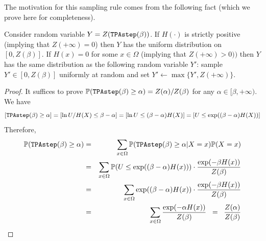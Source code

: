 \documentclass[final,12pt]{colt2018}
\def\P{{\mathbb P}}
\begin{document}


The motivation for this sampling rule comes from the following  fact (which we  prove here for completeness).
\begin{lemma}\label{lemma:TPAstep} Consider random variable $Y=Z({\tt TPAstep}(\beta))$.
If  $H(\cdot)$ is strictly positive (implying that $Z(+\infty)=0$)
then $Y$ has the uniform distribution on $[0,Z(\beta)]$.
If $H(x)=0$ for some $x\in\Omega$ (implying that $Z(+\infty)>0))$
then $Y$ has the same distribution as the following random variable $Y'$:
sample $Y'\in[0,Z(\beta)]$ uniformly at random and set $Y'\leftarrow\max\{Y',Z(+\infty)\}$.
\end{lemma}
\begin{proof}
It suffices to prove 
$\P({\tt TPAstep}(\beta)\ge \alpha)=Z(\alpha)/Z(\beta)$
for any $\alpha\in[\beta,+\infty)$.
We have
 $$[{\tt TPAstep}(\beta)\ge \alpha]=[\ln U/H(X)\le \beta-\alpha]=[\ln U\le (\beta-\alpha)H(X)]=[U\le \exp((\beta-\alpha)H(X))]$$
Therefore,
\begin{eqnarray*}
\P({\tt TPAstep}(\beta)\ge \alpha)
&=&\sum_{x\in\Omega}\P({\tt TPAstep}(\beta)\ge \alpha|X=x)\P(X=x) \\
&=&\sum_{x\in\Omega}\P(U\le \exp((\beta-\alpha)H(x)))\cdot\frac{\exp(-\beta H(x))}{Z(\beta)} \\
&=&\sum_{x\in\Omega}\exp((\beta-\alpha)H(x))\cdot\frac{\exp(-\beta H(x))}{Z(\beta)} \\
&=&\sum_{x\in\Omega}\frac{\exp(-\alpha H(x))}{Z(\beta)} \;\; = \;\; \frac{Z(\alpha)}{Z(\beta)}
\end{eqnarray*}
\end{proof}


\end{document}
